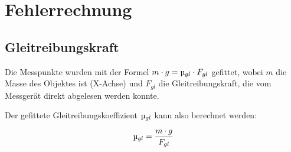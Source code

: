 \section{Fehlerrechnung}

\subsection{Gleitreibungskraft}

Die  Messpunkte  wurden  mit  der  Formel $m \cdot g=\micro_{gl}  \cdot  F_{gl}$
gefittet, wobei $m$ die  Masse  des  Objektes  ist  (X-Achse)  und  $F_{gl}$ die
Gleitreibungskraft,   die   vom  Messger\"at  direkt  abgelesen  werden  konnte.

Der gefittete Gleitreibungskoeffizient $\micro_{gl}$ kann also berechnet werden:

\begin{equation}
    \micro_{gl} = \frac{m \cdot g}{F_{gl}}
\end{equation}



